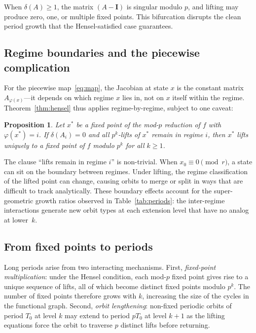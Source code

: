 \documentclass[11pt]{article}
\theoremstyle{plain}
\newtheorem{proposition}[theorem]{Proposition}
\theoremstyle{definition}
\newcommand{\Id}{\mathbf{I}}
\begin{document}
\noindent When $\delta(A) \geq 1$, the matrix $(A-\Id)$ is singular modulo $p$, and lifting may produce zero, one, or multiple fixed points. This bifurcation disrupts the clean period growth that the Hensel-satisfied case guarantees.

\subsection{Regime boundaries and the piecewise complication}

For the piecewise map~\eqref{eq:map}, the Jacobian at state $x$ is the constant matrix $A_{\varphi(x)}$---it depends on which regime $x$ lies in, not on $x$ itself within the regime. Theorem~\ref{thm:hensel} thus applies regime-by-regime, subject to one caveat:

\begin{proposition}
\label{prop:pw-hensel}
Let $x^*$ be a fixed point of the mod-$p$ reduction of $f$ with $\varphi(x^*) = i$. If $\delta(A_i) = 0$ and all $p^k$-lifts of $x^*$ remain in regime $i$, then $x^*$ lifts uniquely to a fixed point of $f$ modulo $p^k$ for all $k \geq 1$.
\end{proposition}

The clause ``lifts remain in regime $i$'' is non-trivial. When $x_0 \equiv 0 \pmod{r}$, a state can sit on the boundary between regimes. Under lifting, the regime classification of the lifted point can change, causing orbits to merge or split in ways that are difficult to track analytically. These boundary effects account for the super-geometric growth ratios observed in Table~\ref{tab:periods}: the inter-regime interactions generate new orbit types at each extension level that have no analog at lower~$k$.

\subsection{From fixed points to periods}

Long periods arise from two interacting mechanisms. First, \emph{fixed-point multiplication}: under the Hensel condition, each mod-$p$ fixed point gives rise to a unique sequence of lifts, all of which become distinct fixed points modulo $p^k$. The number of fixed points therefore grows with $k$, increasing the size of the cycles in the functional graph. Second, \emph{orbit lengthening}: non-fixed periodic orbits of period $T_0$ at level $k$ may extend to period $p T_0$ at level $k+1$ as the lifting equations force the orbit to traverse $p$ distinct lifts before returning.
\end{document}
